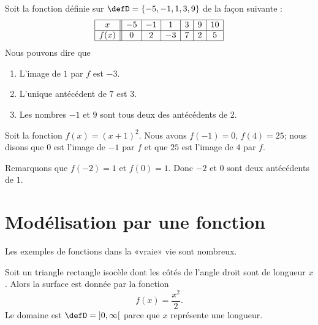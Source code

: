 
\begin{example}
    Soit la fonction définie sur \( \defD=\{ -5,-1,1,3,9 \}\) de la façon suivante :
    \begin{equation}
        \begin{array}[h]{|c||c|c|c|c|c|c|}
            \hline
            x&-5&-1&1&3&9&10\\
            \hline
            f(x)&0&2&-3&7&2&5\\
            \hline
        \end{array}
    \end{equation}
    Nous pouvons dire que
    \begin{enumerate}
        \item
            L'image de \( 1\) par \( f\) est \( -3\).
        \item
            L'unique antécédent de \( 7\) est \( 3\).
        \item
            Les nombres \( -1\) et \( 9\) sont tous deux des antécédents de \( 2\).
    \end{enumerate}
\end{example}

\begin{example}
    Soit la fonction \( f(x)=(x+1)^2\). Nous avons \( f(-1)=0\), \( f(4)=25\); nous disons que \( 0\) est l'image de \( -1\) par \( f\) et que \( 25\) est l'image de \( 4\) par \( f\).

    Remarquons que \( f(-2)=1\) et \( f(0)=1\). Donc \( -2\) et \( 0\) sont deux antécédents de \( 1\).
\end{example}

\section{Modélisation par une fonction}

Les exemples de fonctions dans la «vraie» vie sont nombreux.

\begin{example}
    Soit un triangle rectangle isocèle dont les côtés de l'angle droit sont de longueur \( x\). Alors la surface est donnée par la fonction
    \begin{equation}
        f(x)=\frac{ x^2 }{2}.
    \end{equation}
    Le domaine est \( \defD=\mathopen] 0 , \infty \mathclose[\) parce que \( x\) représente une longueur.
\end{example}

